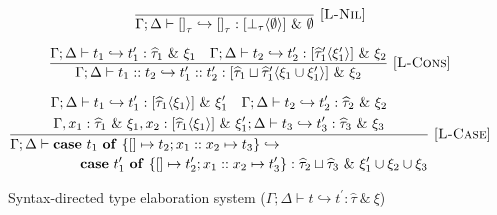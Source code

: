 \documentclass{llncs}
\newcommand{\VER}{\\[1.5ex]}
\newcommand{\Rule}[3]{\frac{#2}{#3}\mbox{\ [\textsc{#1}]}}
\newcommand{\Throws}[2]{#1\langle #2\rangle}    %
\newcommand{\ExnTy}{\widehat\tau}
\newcommand{\ExnTyList}[2]{\left[\Throws{#1}{#2}\right]\!}
\newcommand{\Exn}{\xi}
\newcommand{\ExnUnion}[2]{#1 \cup #2}
\newcommand{\ExnEmpty}{\emptyset}
\newcommand{\Tm}{t}
\newcommand{\TmVar}{x}
\newcommand{\TmNil}[1]{\left[\right]_{#1}}
\newcommand{\TmCons}[2]{#1 :: #2}
\newcommand{\TmCase}[5]{\mathbf{case}\ #1\ \mathbf{of}\ \{\left[\right]\mapsto #2; #3 :: #4 \mapsto #5\}}
\newcommand{\Ty}{\tau}
\newcommand{\TyJoin}[2]{#1 \sqcup #2}
\newcommand{\TyEnv}{\Gamma}
\newcommand{\KiEnv}{\Delta}
\newcommand{\BottomTy}[1]{\bot_{#1}}
\newcommand{\JudgeElab}[6]{{#1; #2 \vdash #3 \hookrightarrow #4 : #5\ \&\ #6}}
\newcommand{\JudgeElabM}[6]{{#1; #2 \vdash #3 \hookrightarrow}\\{\quad\quad\quad\quad #4 : #5\ \&\ #6}}
\begin{document}
\begin{figure*}[p]
\begin{gather*}
{             }             
        \VER
        \Rule{L-Nil}
             {}
             {\JudgeElab{\TyEnv}
                        {\KiEnv}
                        {\TmNil{\Ty}}
                        {\TmNil{\Ty}}
                        {\ExnTyList{\BottomTy{\Ty}}{\ExnEmpty}}
                        {\ExnEmpty}
             }
        \VER
        \Rule{L-Cons}
             {\JudgeElab{\TyEnv}
                        {\KiEnv}
                        {\Tm_1}
                        {\Tm_1^\prime}
                        {\ExnTy_1}
                        {\Exn_1}
              \quad
              \JudgeElab{\TyEnv}
                        {\KiEnv}
                        {\Tm_2}
                        {\Tm_2^\prime}
                        {\ExnTyList{\ExnTy_1^\prime}{\Exn_1^\prime}}
                        {\Exn_2}
             }
             {\JudgeElab{\TyEnv}
                        {\KiEnv}
                        {\TmCons{\Tm_1}{\Tm_2}}
                        {\TmCons{\Tm_1^\prime}{\Tm_2^\prime}}
                        {\ExnTyList{\TyJoin{\ExnTy_1}{\ExnTy_1^\prime}}{\ExnUnion{\Exn_1}{\Exn_1^\prime}}}
                        {\Exn_2}
             }
        \VER
        \Rule{L-Case}
             {\begin{gathered}
                  \JudgeElab{\TyEnv}
                            {\KiEnv}
                            {\Tm_1}
                            {\Tm_1^\prime}
                            {\ExnTyList{\ExnTy_1}{\Exn_1}}
                            {\Exn_1^\prime}
                  \quad
                  \JudgeElab{\TyEnv}
                            {\KiEnv}
                            {\Tm_2}
                            {\Tm_2^\prime}
                            {\ExnTy_2}
                            {\Exn_2}
                  \\
                  \JudgeElab{\TyEnv, \TmVar_1 : \ExnTy_1\ \&\ \Exn_1, \TmVar_2 : \ExnTyList{\ExnTy_1}{\Exn_1}\ \&\ \Exn_1^\prime}
                            {\KiEnv}
                            {\Tm_3}
                            {\Tm_3^\prime}
                            {\ExnTy_3}
                            {\Exn_3}
              \end{gathered}
             }
             {\begin{multlined}
                  \JudgeElabM{\TyEnv}
                             {\KiEnv}                 
                             {\TmCase{\Tm_1}{\Tm_2}{\TmVar_1}{\TmVar_2}{\Tm_3}}
                             {\TmCase{\Tm_1^\prime}{\Tm_2^\prime}{\TmVar_1}{\TmVar_2}{\Tm_3^\prime}}
                             {\TyJoin{\ExnTy_2}{\ExnTy_3}}
                             {\ExnUnion{\Exn_1^\prime}{\ExnUnion{\Exn_2}{\Exn_3}}}
              \end{multlined}
             }
    \end{gather*}
    \caption{Syntax-directed type elaboration system ($\JudgeElab{\TyEnv}{\KiEnv}{\Tm}{\Tm^\prime}{\ExnTy}{\Exn}$)}\label{type-elaboration-system}
\end{figure*}
\end{document}
